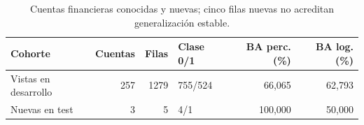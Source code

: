 \begin{table}[htbp]
\centering\small
\caption{Cuentas financieras conocidas y nuevas; cinco filas nuevas no acreditan generalización estable.}\label{tab:tf-cohortes}
\begin{tabular}{lrrlrr}\toprule
Cohorte & Cuentas & Filas & Clase 0/1 & BA perc. (\%) & BA log. (\%) \\ \midrule
Vistas en desarrollo & 257 & 1279 & 755/524 & 66,065 & 62,793 \\
Nuevas en test & 3 & 5 & 4/1 & 100,000 & 50,000 \\
\bottomrule\end{tabular}
\end{table}
